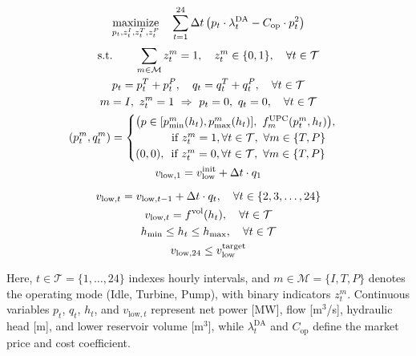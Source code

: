 \documentclass[journal]{IEEEtran}
\begin{document}
\begin{subequations}
\label{eq:uphes_scheduling_problem}
\begin{gather}
\underset{p_t, z_t^I, z_t^T, z_t^P}{\text{maximize}} \quad \sum_{t=1}^{24} \Delta t \left( p_t \cdot \lambda^{\text{DA}}_t - C_{\text{op}} \cdot p_t^2 \right) \label{eq:objective_complete} \\[2pt]
\text{s.t.} \qquad \sum_{m \in \mathcal{M}} z_t^m = 1, \quad z_t^m \in \{0,1\}, \quad \forall t \in \mathcal{T} \label{eq:mode_sum_binary}\\
p_t = p_t^T + p_t^P,\quad q_t = q_t^T + q_t^P,\quad \forall t \in \mathcal{T} \label{eq:agg_power_flow}\\
 m = I, \ z_t^m = 1 \ \Rightarrow\  p_t = 0,\ q_t = 0, \quad \forall t \in \mathcal{T} \label{eq:idle_indicator}\\
(p_t^m, q_t^m) = 
\begin{cases}
\big(p \in [p_{\min}^m(h_t), p_{\max}^m(h_t)],\ f_m^{\text{UPC}}(p_t^m, h_t)\big), \\
\phantom{(0, 0),} \hspace{0.7em} \text{if } z_t^m = 1, \forall t \in \mathcal{T},\ \forall m \in \{T, P\} \\
(0, 0), \hspace{0.5em} \text{if } z_t^m = 0, \forall t \in \mathcal{T},\ \forall m \in \{T, P\}
\end{cases} 
\label{eq:upc_constraints}\\
v_{\text{low},1} = v_{\text{low}}^{\text{init}} + \Delta t \cdot q_1 \label{eq:volume_initial} \\[6pt]
v_{\text{low},t} = v_{\text{low},t-1} + \Delta t \cdot q_t, \quad \forall t \in \{2,3,\ldots,24\} \label{eq:volume_dynamics} \\
v_{\text{low},t} = f^{\text{vol}}(h_t), \quad \forall t \in \mathcal{T} \label{eq:volume_head} \\
h_{\min} \le h_t \le h_{\max}, \quad \forall t \in \mathcal{T} \label{eq:head_bounds} \\
v_{\text{low},24} \leq v_{\text{low}}^{\text{target}} \label{eq:Target}
\end{gather}
\end{subequations}

Here, $t \in \mathcal{T}=\{1,\dots,24\}$ indexes hourly intervals, and $m \in \mathcal{M}=\{I, T, P\}$ denotes the operating mode (Idle, Turbine, Pump), with binary indicators $z_t^m$. Continuous variables $p_t$, $q_t$, $h_t$, and $v_{\text{low},t}$ represent net power [MW], flow [m$^3$/s], hydraulic head [m], and lower reservoir volume [m$^3$], while $\lambda_t^{\text{DA}}$ and $C_{\text{op}}$ define the market price and cost coefficient.
\end{document}
